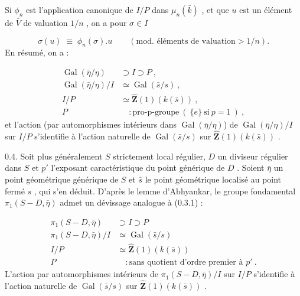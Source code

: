 
Si  $\phi_n$  est l'application canonique de  $I/P$  dans  $\mu_n(\bar{k})$ , et que  $u$  est un élément de  $\bar{V}$  de valuation  $1/n$ , on a pour  $\sigma \in I$

\begin{equation*}
\sigma(u) \;\equiv\; \phi_n(\sigma).u \qquad (\text{mod. éléments de valuation} > 1/n).
\end{equation*}
En résumé, on a :

\begin{equation}\tag{0.3.1}
\begin{aligned}
\operatorname{Gal}(\bar\eta/\eta) &\supset I \supset P \ , \\
\operatorname{Gal}(\bar\eta/\eta)/I &\simeq \operatorname{Gal}(\bar s/s) \ , \\
I/P &\simeq \hat{\mathbf{Z}}(1)(k(\bar s)) \ , \\
P &\quad : \text{pro-p-groupe} \ (\ \{e\} \ \text{si} \ p = 1 \ ) \ ,
\end{aligned}
\end{equation}
et l'action (par automorphismes intérieurs dans  $\operatorname{Gal}(\bar\eta/\eta)$) de  $\operatorname{Gal}(\bar\eta/\eta)/I$  sur  $I/P$  s'identifie à l'action naturelle de  $\operatorname{Gal}(\bar s/s)$  sur  $\hat{\mathbf{Z}}(1)(k(\bar s))$  .

0.4.  Soit plus généralement  $S$  strictement local régulier, $D$  un diviseur régulier dans  $S$  et  $p'$  l'exposant caractéristique du point générique de  $D$ . Soient  $\bar\eta$  un point géométrique générique de  $S$  et  $\bar s$  le point géométrique localisé au point fermé  $s$ , qui s'en déduit. D'après le lemme d'Abhyankar, le groupe fondamental  $\pi_1(S\!-\!D,\bar\eta)$  admet un dévissage analogue à (0.3.1) :

\begin{equation}\tag{0.4.1}
\begin{aligned}
\pi_1(S\!-\!D,\bar\eta) &\supset I \supset P \\
\pi_1(S\!-\!D,\bar\eta)/I &\simeq \operatorname{Gal}(\bar s/s) \\
I/P &\simeq \hat{\mathbf{Z}}(1)(k(\bar s)) \\
P &\quad : \text{sans quotient d'ordre premier à } p' \ .
\end{aligned}
\end{equation}
L'action par automorphismes intérieurs de  $\pi_1(S\!-\!D,\bar\eta)/I$  sur  $I/P$  s'identifie à l'action naturelle de  $\operatorname{Gal}(\bar s/s)$  sur  $\hat{\mathbf{Z}}(1)(k(\bar s))$  .


